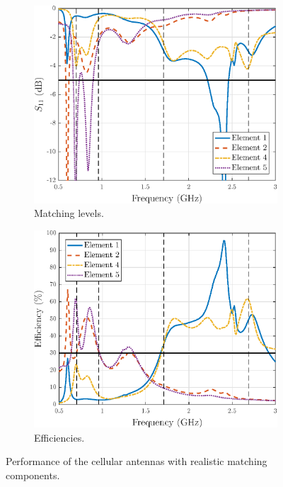 \begin{figure}[H]
    \centering
    \begin{subfigure}[b]{0.49\textwidth}
        \includegraphics[width=\textwidth]{img/diversity_final_real_match.eps}
        \caption{Matching levels.}
        \label{fig:div_match_real}
    \end{subfigure}
    \begin{subfigure}[b]{0.49\textwidth}
        \includegraphics[width=\textwidth]{img/diversity_eff_real.eps}
        \caption{Efficiencies.}
        \label{fig:div_eff_real}
    \end{subfigure}
    \caption{Performance of the cellular antennas with realistic matching components.}
    \label{fig:div_real}
\end{figure}

